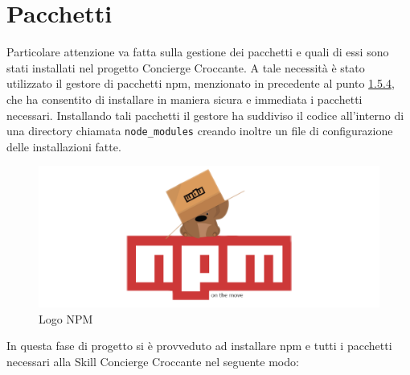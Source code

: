 \section{Pacchetti}
Particolare attenzione va fatta sulla gestione dei pacchetti e quali di essi sono stati installati nel progetto Concierge Croccante. A tale necessità è stato utilizzato il gestore di pacchetti npm, menzionato in precedente al punto \hyperref[npm]{1.5.4}, che ha consentito di installare in maniera sicura e immediata i pacchetti necessari. Installando tali pacchetti il gestore ha suddiviso il codice all'interno di una directory chiamata \texttt{node\_modules} creando inoltre un file di configurazione delle installazioni fatte.
\begin{figure}[H]
	\includegraphics[width=12cm]{immagini/logo-npm.png}
	\caption{\label{fig:logo_npm}Logo NPM}
\end{figure}
\noindent In questa fase di progetto si è provveduto ad installare npm e tutti i pacchetti necessari alla Skill Concierge Croccante nel seguente modo:
